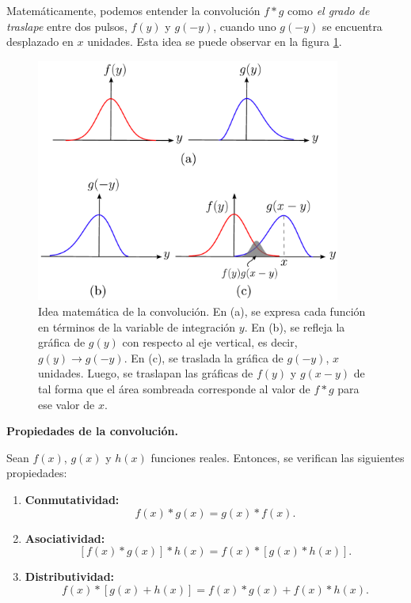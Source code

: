Matemáticamente, podemos entender la convolución $f * g$ como \emph{el grado de traslape} entre dos pulsos, $f(y)$ y $g(-y)$, cuando uno $g(-y)$ se encuentra desplazado en $x$ unidades. Esta idea se puede observar en la figura \ref{fig:IdeaConvolucion}.

\begin{figure}[htbp]
    \centering
    \includegraphics[width=10cm]{Figuras/Idea-Convolucion.pdf}
    \caption{Idea matemática de la convolución. En (a), se expresa cada función en términos de la variable de integración $y$. En (b), se refleja la gráfica de $g(y)$ con respecto al eje vertical, es decir, $g(y) \rightarrow g(-y)$. En (c), se traslada la gráfica de $g(-y)$, $x$ unidades. Luego, se traslapan las gráficas de $f(y)$ y $g(x-y)$ de tal forma que el área sombreada corresponde al valor de $f * g$ para ese valor de $x$.}
    \label{fig:IdeaConvolucion}
\end{figure}


\begin{propiedad}\textbf{Propiedades de la convolución.}

Sean $f(x)$, $g(x)$ y $h(x)$  funciones reales. Entonces, se verifican las siguientes propiedades:

\begin{enumerate}
    \item \textbf{Conmutatividad:}$$f(x) * g(x) = g(x) * f(x).$$
    
    \item \textbf{Asociatividad:} $$[f(x)*g(x)]*h(x) = f(x)*[g(x)*h(x)].$$
    
    \item \textbf{Distributividad:} $$f(x)*[g(x)+h(x)] = f(x)*g(x) + f(x)*h(x).$$ 
\end{enumerate}
\end{propiedad}

